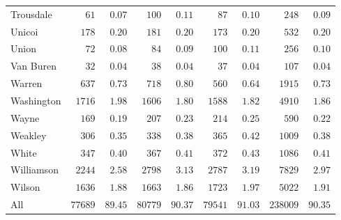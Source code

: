 \documentclass[9pt, oneside]{article}   	%
\begin{document}
\begin{longtable}{lcccccccc}
Trousdale  & $\phantom{000}61$ & $\phantom{0}0.07$ & $\phantom{00}100$ & $\phantom{0}0.11$ & $\phantom{000}87$ & $\phantom{0}0.10$ & $\phantom{000}248$ & $\phantom{0}0.09$ \\
Unicoi  & $\phantom{00}178$ & $\phantom{0}0.20$ & $\phantom{00}181$ & $\phantom{0}0.20$ & $\phantom{00}173$ & $\phantom{0}0.20$ & $\phantom{000}532$ & $\phantom{0}0.20$ \\
Union  & $\phantom{000}72$ & $\phantom{0}0.08$ & $\phantom{000}84$ & $\phantom{0}0.09$ & $\phantom{00}100$ & $\phantom{0}0.11$ & $\phantom{000}256$ & $\phantom{0}0.10$ \\
Van Buren  & $\phantom{000}32$ & $\phantom{0}0.04$ & $\phantom{000}38$ & $\phantom{0}0.04$ & $\phantom{000}37$ & $\phantom{0}0.04$ & $\phantom{000}107$ & $\phantom{0}0.04$ \\
Warren  & $\phantom{00}637$ & $\phantom{0}0.73$ & $\phantom{00}718$ & $\phantom{0}0.80$ & $\phantom{00}560$ & $\phantom{0}0.64$ & $\phantom{00}1915$ & $\phantom{0}0.73$ \\
Washington  & $\phantom{0}1716$ & $\phantom{0}1.98$ & $\phantom{0}1606$ & $\phantom{0}1.80$ & $\phantom{0}1588$ & $\phantom{0}1.82$ & $\phantom{00}4910$ & $\phantom{0}1.86$ \\
Wayne  & $\phantom{00}169$ & $\phantom{0}0.19$ & $\phantom{00}207$ & $\phantom{0}0.23$ & $\phantom{00}214$ & $\phantom{0}0.25$ & $\phantom{000}590$ & $\phantom{0}0.22$ \\
Weakley  & $\phantom{00}306$ & $\phantom{0}0.35$ & $\phantom{00}338$ & $\phantom{0}0.38$ & $\phantom{00}365$ & $\phantom{0}0.42$ & $\phantom{00}1009$ & $\phantom{0}0.38$ \\
White  & $\phantom{00}347$ & $\phantom{0}0.40$ & $\phantom{00}367$ & $\phantom{0}0.41$ & $\phantom{00}372$ & $\phantom{0}0.43$ & $\phantom{00}1086$ & $\phantom{0}0.41$ \\
Williamson  & $\phantom{0}2244$ & $\phantom{0}2.58$ & $\phantom{0}2798$ & $\phantom{0}3.13$ & $\phantom{0}2787$ & $\phantom{0}3.19$ & $\phantom{00}7829$ & $\phantom{0}2.97$ \\
Wilson  & $\phantom{0}1636$ & $\phantom{0}1.88$ & $\phantom{0}1663$ & $\phantom{0}1.86$ & $\phantom{0}1723$ & $\phantom{0}1.97$ & $\phantom{00}5022$ & $\phantom{0}1.91$ \\
\cline{1-1} \cline{2-2} \cline{3-3} \cline{4-4} \cline{5-5} \cline{6-6} \cline{7-7} \cline{8-8} \cline{9-9}%
All  & $77689$ & $89.45$ & $80779$ & $90.37$ & $79541$ & $91.03$ & $238009$ & $90.35$ \\
\hline 
\end{longtable}
\end{document}
